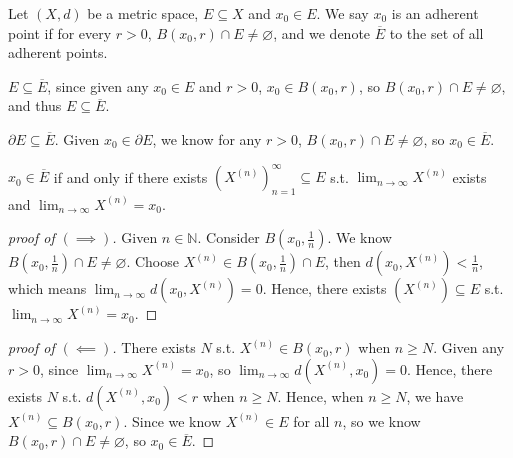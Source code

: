\begin{definition}
    Let \((X,d)\) be a metric space, \(E \subseteq X\) and \(x_0 \in E\). We say \(x_0\) is an adherent point if for every \(r > 0\), \(B(x_0, r) \cap E \neq \varnothing \), and we denote \(\overline{E} \) to the set of all adherent points.      
\end{definition}
\vphantom{text}
\begin{remark} \label{rmk: E in Ebar}
    \(E \subseteq \overline{E} \), since given any \(x_0 \in E\) and \(r > 0\), \(x_0 \in B(x_0, r)\), so \(B(x_0, r) \cap E \neq \varnothing \), and thus \(E \subseteq \overline{E} \).      
\end{remark}
\begin{remark} \label{rmk: pt E in Ebar}
    \(\partial E \subseteq \overline{E} \). Given \(x_0 \in \partial E\), we know for any \(r > 0\), \(B(x_0, r) \cap E \neq \varnothing \), so \(x_0 \in \overline{E} \).    
\end{remark}
\begin{proposition}
    \(x_0 \in \overline{E} \) if and only if there exists \(\left( X^{(n)} \right)_{n=1}^{\infty} \subseteq E\) s.t. \(\lim_{n \to \infty} X^{(n)} \) exists and \(\lim_{n \to \infty} X^{(n)} = x_0\).    
\end{proposition}
\begin{proof}[proof of \((\implies )\)]
    Given \(n \in \mathbb{N} \). Consider \(B\left( x_0, \frac{1}{n} \right) \). We know \(B\left( x_0, \frac{1}{n} \right) \cap E \neq \varnothing  \). Choose \(X^{(n)} \in B\left( x_0, \frac{1}{n} \right) \cap E \), then \(d\left( x_0, X^{(n)} \right) < \frac{1}{n} \), which means \(\lim_{n \to \infty} d\left( x_0, X^{(n)} \right) = 0  \). Hence, there exists \(\left( X^{(n)} \right) \subseteq E \) s.t. \(\lim_{n \to \infty} X^{(n)} = x_0 \).     
\end{proof}
\begin{proof}[proof of \((\impliedby)\)]
    There exists \(N\) s.t. \(X^{(n)} \in B(x_0, r)\) when \(n \ge N\). Given any \(r > 0\), since \(\lim_{n \to \infty} X^{(n)} = x_0 \), so \(\lim_{n \to \infty} d \left( X^{(n)}, x_0 \right) = 0  \). Hence, there exists \(N\) s.t. \(d\left( X^{(n)}, x_0 \right) < r \) when \(n \ge N\). Hence, when \(n \ge N\), we have \(X^{(n)}\subseteq B(x_0, r)\). Since we know \(X^{(n)} \in E\) for all \(n\), so we know \(B(x_0, r) \cap E \neq \varnothing \), so \(x_0 \in \overline{E} \).               
\end{proof}

